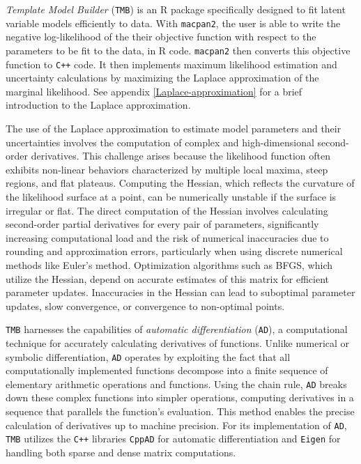 \documentclass[
11pt, %
oneside, %
english, %
singlespacing, %
]{macthesis} %
\begin{document}
\emph{Template Model Builder} (\texttt{TMB}) is an R package specifically designed to fit latent variable models efficiently to data. With \texttt{macpan2}, the user is able to write the negative log-likelihood of the their objective function with respect to the parameters to be fit to the data, in R code. \texttt{macpan2} then converts this objective function to \texttt{C++} code. It then implements maximum likelihood estimation and uncertainty calculations by maximizing the Laplace approximation of the marginal likelihood. See appendix \ref{Laplace-approximation} for a brief introduction to the Laplace approximation.

The use of the Laplace approximation to estimate model parameters and their uncertainties involves the computation of complex and high-dimensional second-order derivatives. This challenge arises because the likelihood function often exhibits non-linear behaviors characterized by multiple local maxima, steep regions, and flat plateaus. Computing the Hessian, which reflects the curvature of the likelihood surface at a point, can be numerically unstable if the surface is irregular or flat. The direct computation of the Hessian involves calculating second-order partial derivatives for every pair of parameters, significantly increasing computational load and the risk of numerical inaccuracies due to rounding and approximation errors, particularly when using discrete numerical methods like Euler's method. Optimization algorithms such as BFGS, which utilize the Hessian, depend on accurate estimates of this matrix for efficient parameter updates. Inaccuracies in the Hessian can lead to suboptimal parameter updates, slow convergence, or convergence to non-optimal points.

\texttt{TMB} harnesses the capabilities of \emph{automatic differentiation} (\texttt{AD}), a computational technique for accurately calculating derivatives of functions. Unlike numerical or symbolic differentiation, \texttt{AD} operates by exploiting the fact that all computationally implemented functions decompose into a finite sequence of elementary arithmetic operations and functions. Using the chain rule, \texttt{AD} breaks down these complex functions into simpler operations, computing derivatives in a sequence that parallels the function's evaluation. This method enables the precise calculation of derivatives up to machine precision. For its implementation of \texttt{AD}, \texttt{TMB} utilizes the \texttt{C++} libraries \texttt{CppAD} for automatic differentiation and \texttt{Eigen} for handling both sparse and dense matrix computations.
\end{document}

